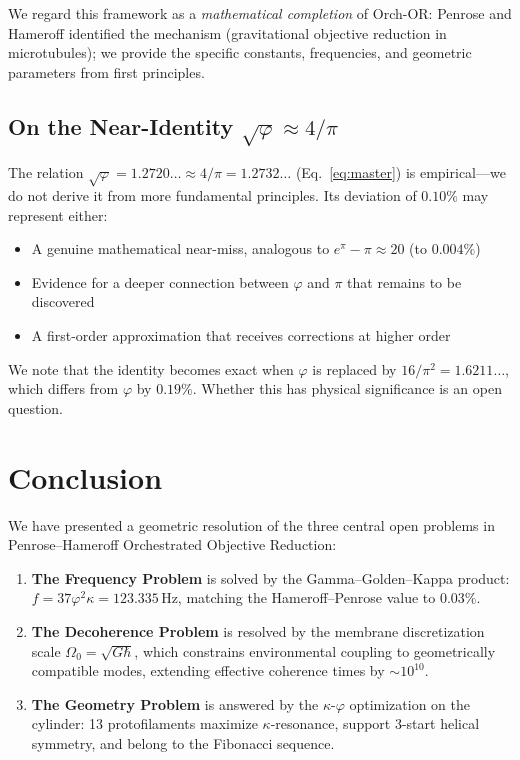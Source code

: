 \documentclass[12pt,a4paper]{article}
\theoremstyle{plain}
\theoremstyle{definition}
\newcommand{\OmegaZero}{\Omega_0}
\newcommand{\golden}{\varphi}
\newcommand{\kap}{\kappa}
\newcommand{\Hz}{\,\mathrm{Hz}}
\begin{document}
We regard this framework as a \emph{mathematical completion} of Orch-OR: Penrose and Hameroff identified the mechanism (gravitational objective reduction in microtubules); we provide the specific constants, frequencies, and geometric parameters from first principles.

\subsection{On the Near-Identity $\sqrt{\golden} \approx 4/\pi$}

The relation $\sqrt{\golden} = 1.2720\ldots \approx 4/\pi = 1.2732\ldots$ (Eq.~\ref{eq:master}) is empirical---we do not derive it from more fundamental principles. Its deviation of $0.10\%$ may represent either:

\begin{itemize}
    \item A genuine mathematical near-miss, analogous to $e^\pi - \pi \approx 20$ (to $0.004\%$)
    \item Evidence for a deeper connection between $\golden$ and $\pi$ that remains to be discovered
    \item A first-order approximation that receives corrections at higher order
\end{itemize}

We note that the identity becomes exact when $\golden$ is replaced by $16/\pi^2 = 1.6211\ldots$, which differs from $\golden$ by $0.19\%$. Whether this has physical significance is an open question.

\section{Conclusion}
\label{sec:conclusion}

We have presented a geometric resolution of the three central open problems in Penrose--Hameroff Orchestrated Objective Reduction:

\begin{enumerate}
    \item \textbf{The Frequency Problem} is solved by the Gamma--Golden--Kappa product: $f = 37\golden^2\kap = 123.335\Hz$, matching the Hameroff--Penrose value to $0.03\%$.
    \item \textbf{The Decoherence Problem} is resolved by the membrane discretization scale $\OmegaZero = \sqrt{G\hbar}$, which constrains environmental coupling to geometrically compatible modes, extending effective coherence times by $\sim 10^{10}$.
    \item \textbf{The Geometry Problem} is answered by the $\kap$-$\golden$ optimization on the cylinder: 13 protofilaments maximize $\kap$-resonance, support 3-start helical symmetry, and belong to the Fibonacci sequence.
\end{enumerate}
\end{document}
